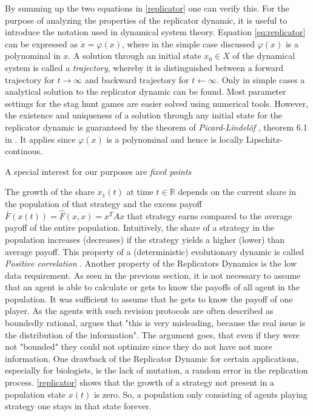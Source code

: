 \documentclass[12pt]{article}
\newcommand{\realnumb}{\mathbb{R}}
\begin{document}
By summing up the two equations in \eqref{replicator} one can verify this.
For the purpose of analyzing the properties of the replicator dynamic, it is 
useful to introduce the notation used in dynamical system theory. 
Equation \eqref{eq:replicator} can be expressed as $\dot{x}=\varphi(x)$, where in
the simple case discussed $\varphi(x)$ is a polynominal in $x$.
A solution through an initial state $x_0 \in X$ of the dynamical system is called a 
\textit{trajectory}, whereby it is distinguished between a forward trajectory 
for $t \rightarrow \infty$ and backward trajectory for $t \leftarrow \infty$.
Only in simple cases a analytical solution to the replicator dynamic can be 
found. Most parameter settings for the stag hunt games are easier solved using
numerical tools. However, the existence and uniqueness of a solution through
any initial state for the replicator dynamic is guaranteed by the theorem 
of \textit{Picard-Lindel\"of} , theorem 6.1 in 
\textcite[74]{weibull_evolutionary_1997}. It applies since $\varphi(x)$ is a 
polynominal and hence is locally Lipschitz-continous. 

A special interest for our purposes are \textit{fixed points} 

The growth of the share $\dot{x}_1(t)$ at time $t \in \realnumb$ depends on the current share in the
population of that strategy and the excess payoff $\bar{F}(x(t)) 
= \hat{F}(x,x) = x^T A x$ that strategy earns 
compared to the average payoff of the entire population. Intuitively, the
share of a strategy in the population increases (decreases) if the strategy
yields a higher (lower) than average payoff. This property of a (deterministic)
evolutionary dynamic is called \textit{Positive correlation} \cite{sandholm}.
Another property of the Replicators Dynamics is the low data requirement. As 
seen in the previous section, it is not necessary to assume that an agent
is able to calculate or gets to know the payoffs of all agent in the population.
It was sufficient to assume that he gets to know the payoff of one player. 
As the agents with such revision protocols are often described as boundedly
rational, \cite{gintis} argues that "this is very misleading, because the real 
issue is the distribution of the information". The argument goes, that even
if they were not "bounded" they could not optimize since they do not have
not more information. 
One drawback of the Replicator Dynamic for certain applications, especially
for biologists, is the lack of mutation, a random error in the replication 
process.
\eqref{replicator} shows that the growth of a strategy not present in a 
population state $x(t)$ is zero. So, a population only consisting of agents
playing strategy one stays in that state forever. 
\end{document}
